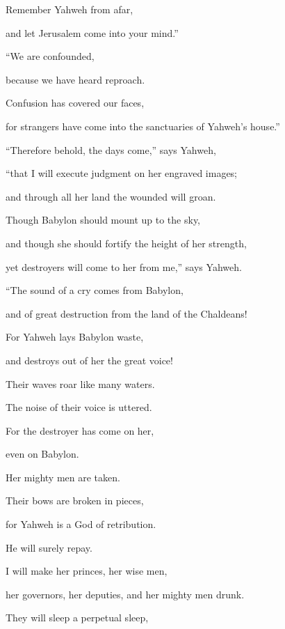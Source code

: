 {\par }{\Q Remember Yahweh from afar,
\par }{\QB and let Jerusalem come into your mind.”
\par }{\BB \par }{\Q {}“We are confounded,
\par }{\QB because we have heard reproach.
\par }{\Q Confusion has covered our faces,
\par }{\QB for strangers have come into the sanctuaries of Yahweh’s house.”
\par }{\BB \par }{\Q {}“Therefore behold, the days come,” says Yahweh,
\par }{\QB “that I will execute judgment on her engraved images;
\par }{\QB and through all her land the wounded will groan.
\par }{\Q {}Though Babylon should mount up to the sky,
\par }{\QB and though she should fortify the height of her strength,
\par }{\QB yet destroyers will come to her from me,” says Yahweh.
\par }{\BB \par }{\Q {}“The sound of a cry comes from Babylon,
\par }{\QB and of great destruction from the land of the Chaldeans!
\par }{\Q {}For Yahweh lays Babylon waste,
\par }{\QB and destroys out of her the great voice!
\par }{\Q Their waves roar like many waters.
\par }{\QB The noise of their voice is uttered.
\par }{\Q {}For the destroyer has come on her,
\par }{\QB even on Babylon.
\par }{\Q Her mighty men are taken.
\par }{\QB Their bows are broken in pieces,
\par }{\Q for Yahweh is a God of retribution.
\par }{\QB He will surely repay.
\par }{\Q {}I will make her princes, her wise men,
\par }{\QB her governors, her deputies, and her mighty men drunk.
\par }{\Q They will sleep a perpetual sleep,
}
